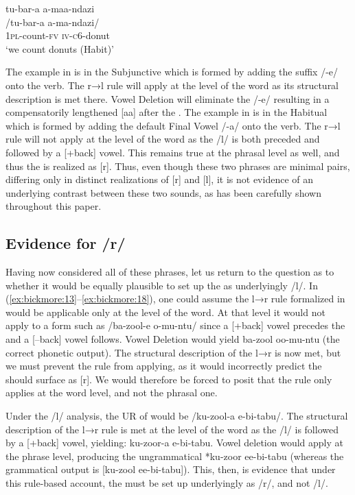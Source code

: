 \documentclass[output=paper,modfonts,nonflat,
colorlinks, citecolor=brown,
draftmode,
]{langsci/langscibook}
\begin{document}
\ea\label{ex:bickmore:23}
\glll    tu-bar-a a-maa-ndazi\\
    /tu-bar-a a-ma-ndazi/	\\
\textsc{1pl-}\textup{count}\textsc{-fv} \textsc{iv-\textsc{c6}-}\textup{donut}\\
\glt    ‘we count donuts (Habit)’
\z

\largerpage
The example in  is in the Subjunctive which is formed by adding the suffix \mbox{/-e/} onto the verb. The r→l rule will apply at the level of the word as its structural description is met there. Vowel Deletion will eliminate the /-e/ resulting in a compensatorily lengthened [aa] after the . The example in  is in the Habitual which is formed by adding the default Final Vowel /-a/ onto the verb. The r→l rule will not apply at the level of the word as the /l/ is both preceded and followed by a [+back] vowel. This remains true at the phrasal level as well, and thus the  is realized as [r]. Thus, even though these two phrases are minimal pairs, differing only in distinct realizations of [r] and [l], it is not evidence of an underlying contrast between these two sounds, as has been carefully shown throughout this paper.

\subsection{Evidence for /r/}\label{sec:bickmore:2.3}

Having now considered all of these phrases, let us return to the question as to whether it would be equally plausible to set up the  as underlyingly /l/. In (\ref{ex:bickmore:13}--\ref{ex:bickmore:18}), one could assume the l→r rule formalized in  would be applicable only at the level of the word. At that level it would not apply to a form such as /ba-zool-e o-mu-ntu/  since a [+back] vowel precedes the  and a \mbox{[--back]} vowel follows. Vowel Deletion would yield ba-zool oo-mu-ntu (the correct phonetic output). The structural description of the l→r is now met, but we must prevent the rule from applying, as it would incorrectly predict the  should surface as [r]. We would therefore be forced to posit that the rule only applies at the word level, and not the phrasal one.

Under the /l/ analysis, the UR of  would be /ku-zool-a e-bi-tabu/. The structural description of the l→r rule is met at the level of the word as the /l/ is followed by a [+back] vowel, yielding: ku-zoor-a e-bi-tabu. 
Vowel deletion would apply at the phrase level, producing the ungrammatical *ku-zoor ee-bi-tabu  
(where\-as the grammatical output is [ku-zool ee-bi-tabu]). This, then, is evidence that under this rule-based account, the  must be set up underlyingly as /r/, and not /l/.
\end{document}
